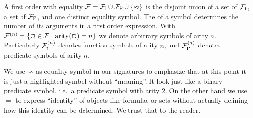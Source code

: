 
\begin{definition}\label{def:signature}
A
first order
 with equality
\( \mathcal{F} = {\mathcal{F}_{\mathsf{f}}} \mathbin{\dot\cup} {\mathcal{F}_{\mathsf{P}}} \mathbin{\dot\cup} \{\approx \} \)
is the disjoint union of
a set of  \( {\mathcal{F}_{\mathsf{f}}} \),
a set of  \( {\mathcal{F}_{\mathsf{P}}} \),
and one distinct equality symbol.
%
The  of a symbol determines the number of its arguments in a first order expression. 
With \( \mcFn = \{ \Pf\in\mcF \mid \arity(\Pf) = n \} \) 
we denote arbitrary symbols of arity \(n\). 
Particularly \( {\mathcal{F}^{(n)}_{\mathsf{f}}} \) denotes function symbols of arity \( n \), 
and \( {\mathcal{F}^{(n)}_{\mathsf{P}}} \) denotes predicate symbols of arity \( n \).

\end{definition}

\begin{remark}
    We use \( \approx \) as equality symbol in our signatures to emphasize
    that at this point it is just a highlighted symbol
    without “meaning”.
    It look just like a binary predicate symbol, i.e.~a predicate symbol with arity \( 2\).
    On the other hand we use \( = \) to express “identity” of objects
    like formulae or sets
    without actually defining how this identity can be determined.
    We trust that to the reader.
\end{remark}
